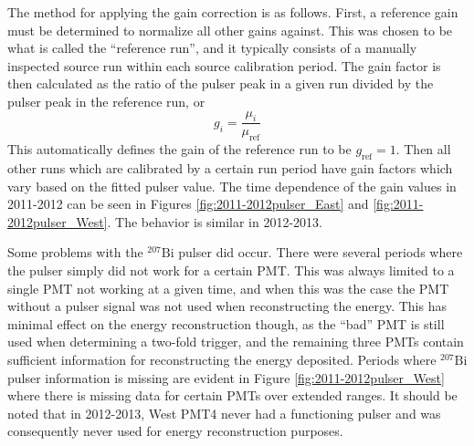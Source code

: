 The method for applying the gain correction is as follows. First, a reference gain must be determined
to normalize all other gains against. This was chosen to be what is called the ``reference run'', and it
typically consists of a manually inspected source run within each source calibration period. The gain factor
is then calculated as the ratio of the pulser peak in a given run divided by the pulser peak in the reference
run, or
%
\begin{equation}
  g_i = \frac{\mu_i}{\mu_{\mathrm{ref}}}
\end{equation}
%
This automatically defines the gain of the reference run to be $g_{\mathrm{ref}}=1$. Then all other runs which are
calibrated by a certain run period have gain factors which vary based on the fitted pulser value. The time
dependence of the gain values in 2011-2012 can be seen in Figures \ref{fig:2011-2012pulser_East}
and \ref{fig:2011-2012pulser_West}. The behavior is similar in 2012-2013.

Some problems with the $^{207}\mathrm{Bi}$ pulser did occur. There were several periods where the pulser
simply did not work for a certain PMT. This was always limited to a single PMT not working at a given time, and when this
was the case the PMT without a pulser signal was not used when reconstructing the energy. This has
minimal effect on the energy reconstruction though, as the ``bad'' PMT is still used when determining
a two-fold trigger, and the remaining three PMTs contain sufficient information for reconstructing the
energy deposited. Periods where $^{207}\mathrm{Bi}$ pulser information is missing are evident in
Figure \ref{fig:2011-2012pulser_West} where there is missing data for certain PMTs over extended ranges.
It should be noted that in 2012-2013, West PMT4 never had a functioning pulser and was consequently never used for
energy reconstruction purposes.

